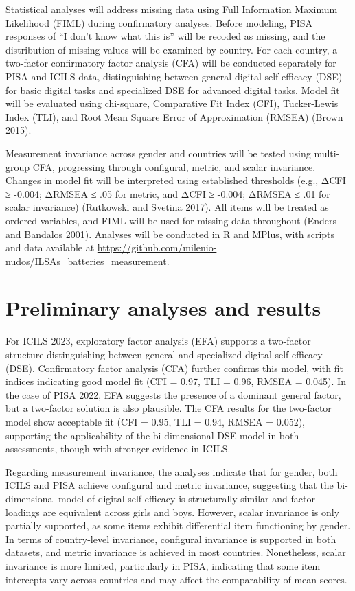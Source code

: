\documentclass[
  letterpaper,
  DIV=11,
  numbers=noendperiod]{scrartcl}
\begin{document}
Statistical analyses will address missing data using Full Information
Maximum Likelihood (FIML) during confirmatory analyses. Before modeling,
PISA responses of ``I don't know what this is'' will be recoded as
missing, and the distribution of missing values will be examined by
country. For each country, a two-factor confirmatory factor analysis
(CFA) will be conducted separately for PISA and ICILS data,
distinguishing between general digital self-efficacy (DSE) for basic
digital tasks and specialized DSE for advanced digital tasks. Model fit
will be evaluated using chi-square, Comparative Fit Index (CFI),
Tucker-Lewis Index (TLI), and Root Mean Square Error of Approximation
(RMSEA) (Brown 2015).

Measurement invariance across gender and countries will be tested using
multi-group CFA, progressing through configural, metric, and scalar
invariance. Changes in model fit will be interpreted using established
thresholds (e.g., ΔCFI ≥ -0.004; ΔRMSEA ≤ .05 for metric, and ΔCFI ≥
-0.004; ΔRMSEA ≤ .01 for scalar invariance) (Rutkowski and Svetina
2017). All items will be treated as ordered variables, and FIML will be
used for missing data throughout (Enders and Bandalos 2001). Analyses
will be conducted in R and MPlus, with scripts and data available at
\url{https://github.com/milenio-nudos/ILSAs_batteries_measurement}.

\section{Preliminary analyses and
results}\label{preliminary-analyses-and-results}

For ICILS 2023, exploratory factor analysis (EFA) supports a two-factor
structure distinguishing between general and specialized digital
self-efficacy (DSE). Confirmatory factor analysis (CFA) further confirms
this model, with fit indices indicating good model fit (CFI = 0.97, TLI
= 0.96, RMSEA = 0.045). In the case of PISA 2022, EFA suggests the
presence of a dominant general factor, but a two-factor solution is also
plausible. The CFA results for the two-factor model show acceptable fit
(CFI = 0.95, TLI = 0.94, RMSEA = 0.052), supporting the applicability of
the bi-dimensional DSE model in both assessments, though with stronger
evidence in ICILS.

Regarding measurement invariance, the analyses indicate that for gender,
both ICILS and PISA achieve configural and metric invariance, suggesting
that the bi-dimensional model of digital self-efficacy is structurally
similar and factor loadings are equivalent across girls and boys.
However, scalar invariance is only partially supported, as some items
exhibit differential item functioning by gender. In terms of
country-level invariance, configural invariance is supported in both
datasets, and metric invariance is achieved in most countries.
Nonetheless, scalar invariance is more limited, particularly in PISA,
indicating that some item intercepts vary across countries and may
affect the comparability of mean scores.
\end{document}
